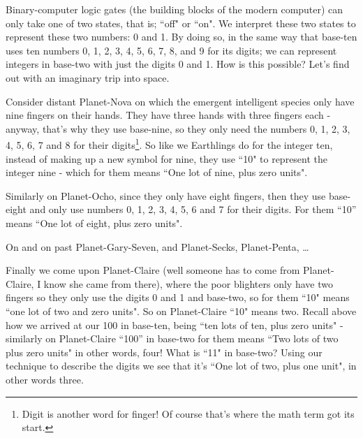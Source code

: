 \documentclass{article}
\begin{document}
Binary-computer logic gates (the building blocks of the modern computer)
can only take one of two states, that is; ``off" or ``on".
We interpret these two states to represent these two numbers: 0 and 1.
By doing so, in the same way that base-ten uses ten numbers 0,
1, 2, 3, 4, 5, 6, 7, 8, and 9 for its digits; we can represent integers
in base-two with just the digits 0 and 1. How is this possible?
Let's find out with an imaginary trip into space.

Consider distant Planet-Nova on which the emergent
intelligent species only have nine fingers on their hands.
They have three hands with three fingers each - anyway,
that's why they use base-nine, so they only need the numbers 0,
1, 2, 3, 4, 5, 6, 7 and 8 for their digits\footnote{Digit is another word for finger! Of course that's where the math term got its start.}.
So like we Earthlings do for the integer ten,
instead of making up a new symbol for nine,
they use ``10" to represent the integer nine - which
for them means ``One lot of nine, plus zero units".

Similarly on Planet-Ocho, since they only have eight fingers,
then they use base-eight and only use numbers 0, 1,
2, 3, 4, 5, 6 and 7 for their digits. For them ``10''
means ``One lot of eight, plus zero units".

On and on past Planet-Gary-Seven, and Planet-Secks, Planet-Penta, \dots{}

Finally we come upon Planet-Claire (well someone
has to come from Planet-Claire,
I know she came from there),
where the poor blighters only have two fingers
so they only use the digits 0 and 1 and base-two,
so for them ``10" means ``one lot of two and zero units".
So on Planet-Claire ``10" means two.
Recall above how we arrived at our 100 in base-ten,
being ``ten lots of ten,
plus zero units" - similarly on Planet-Claire ``100''
in base-two for them means ``Two lots of two plus zero units" in other words,
four! What is ``11" in base-two? Using our technique to
describe the digits we see that it's ``One lot of two, plus one unit",
in other words three.
\end{document}
